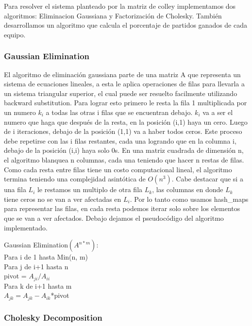 Para resolver el sistema planteado por la matriz de colley implementamos dos algoritmos: Eliminacion Gaussiana y Factorización de Cholesky. También desarrollamos un algoritmo que calcula el porcentaje de partidos ganados de cada equipo. 

\subsubsection{Gaussian Elimination}

El algoritmo de eliminación gaussiana parte de una matriz A que representa un sistema de ecuaciones lineales, a esta le aplica operaciones de filas para llevarla a un sistema triangular superior, el cual puede ser resuelto facilmente utilizando backward substitution. Para lograr esto primero le resta la fila 1 multiplicada por un numero $k_i$ a todas las otras i filas que se encuentran debajo. $k_i$ va a ser el numero que haga que después de la resta, en la posición (i,1) haya un cero. Luego de i iteraciones, debajo de la posición (1,1) va a haber todos ceros. Este proceso debe repetirse con las i filas restantes, cada una logrando que en la columna i, debajo de la posición (i,i) haya solo 0s. En una matriz cuadrada de dimensión n, el algoritmo blanquea n columnas, cada una teniendo que hacer n restas de filas. Como cada resta entre filas tiene un costo computacional lineal, el algoritmo termina teniendo una complejidad asintótica de $O(n^3)$. Cabe destacar que si a una fila $L_i$ le restamos un multiplo de otra fila $L_k$, las columnas en donde $L_k$ tiene ceros no se van a ver afectadas en $L_i$. Por lo tanto como usamos hash_maps para representar las filas, en cada resta podemos iterar solo sobre los elementos que se van a ver afectados. Debajo dejamos el pseudocódigo del algoritmo implementado.

\begin{codesnippet}
Gaussian Elimination$(A^{n*m})$:\\
\tab Para i de 1 hasta Min(n, m)\\
\tab \tab Para j de i+1 hasta n\\
\tab \tab pivot = $A_{ji}/A_{ii}$\\
\tab \tab \tab Para k de i+1 hasta m\\
\tab \tab \tab \tab $A_{jk} = A_{jk}-A_{ik}$*pivot\\

\end{codesnippet}

\subsubsection{Cholesky Decomposition}


